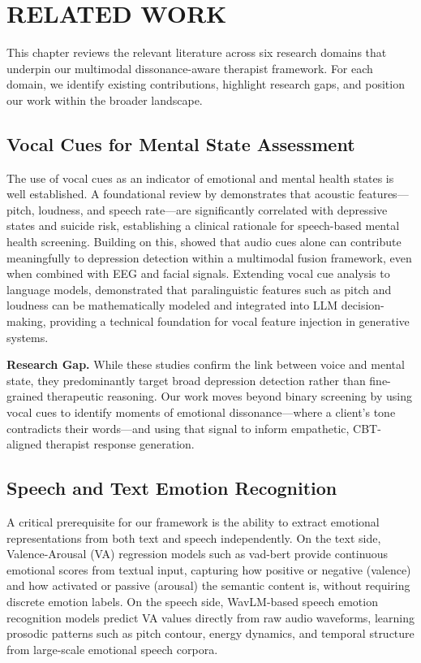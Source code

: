 \setlength{\footskip}{8mm}

\chapter{RELATED WORK}

This chapter reviews the relevant literature across six research domains that underpin our multimodal dissonance-aware therapist framework. For each domain, we identify existing contributions, highlight research gaps, and position our work within the broader landscape.

\section{Vocal Cues for Mental State Assessment}

The use of vocal cues as an indicator of emotional and mental health states is well established. A foundational review by \cite{cummins2015review} demonstrates that acoustic features---pitch, loudness, and speech rate---are significantly correlated with depressive states and suicide risk, establishing a clinical rationale for speech-based mental health screening. Building on this, \cite{thirunavukkarasu2024deep} showed that audio cues alone can contribute meaningfully to depression detection within a multimodal fusion framework, even when combined with EEG and facial signals. Extending vocal cue analysis to language models, \cite{sun2024beyond} demonstrated that paralinguistic features such as pitch and loudness can be mathematically modeled and integrated into LLM decision-making, providing a technical foundation for vocal feature injection in generative systems.

\textbf{Research Gap.} While these studies confirm the link between voice and mental state, they predominantly target broad depression detection rather than fine-grained therapeutic reasoning. Our work moves beyond binary screening by using vocal cues to identify moments of emotional dissonance---where a client's tone contradicts their words---and using that signal to inform empathetic, CBT-aligned therapist response generation.

\section{Speech and Text Emotion Recognition}

A critical prerequisite for our framework is the ability to extract emotional representations from both text and speech independently. On the text side, Valence-Arousal (VA) regression models such as vad-bert \cite{mitsios-etal-2024-improved} provide continuous emotional scores from textual input, capturing how positive or negative (valence) and how activated or passive (arousal) the semantic content is, without requiring discrete emotion labels. On the speech side, WavLM-based speech emotion recognition models \cite{mitsios-etal-2024-improved} predict VA values directly from raw audio waveforms, learning prosodic patterns such as pitch contour, energy dynamics, and temporal structure from large-scale emotional speech corpora.

